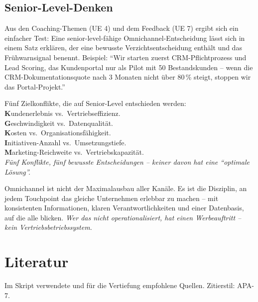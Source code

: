 \documentclass[11pt,a4paper,oneside]{article}
\newcommand{\caveatfontfallback}{\itshape}
\newcommand\caveatfont{\caveatfontfallback}%
\newcommand{\akzent}[1]{{\caveatfont\color{lpAmber}#1}}
\begin{document}
\subsection{Senior-Level-Denken}

Aus den Coaching-Themen (UE 4) und dem Feedback (UE 7) ergibt sich ein einfacher Test: Eine senior-level-fähige Omnichannel-Entscheidung lässt sich in einem Satz erklären, der eine bewusste Verzichts­entscheidung enthält und das Frühwarnsignal benennt. Beispiel: ``Wir starten zuerst CRM-Pflichtprozess und Lead Scoring, das Kundenportal nur als Pilot mit 50 Bestandskunden -- wenn die CRM-Dokumentationsquote nach 3 Monaten nicht über 80\,\% steigt, stoppen wir das Portal-Projekt.''

\begin{eselsbox}[Eselsbrücke: \akzent{K-G-K-I-M}]
Fünf Zielkonflikte, die auf Senior-Level entschieden werden:\\[2pt]
\textbf{K}undenerlebnis vs.\ Vertriebseffizienz.\\
\textbf{G}eschwindigkeit vs.\ Datenqualität.\\
\textbf{K}osten vs.\ Organisationsfähigkeit.\\
\textbf{I}nitiativen-Anzahl vs.\ Umsetzungstiefe.\\
\textbf{M}arketing-Reichweite vs.\ Vertriebskapazität.\\[2pt]
\emph{Fünf Konflikte, fünf bewusste Entscheidungen -- keiner davon hat eine ``optimale Lösung''.}
\end{eselsbox}

\begin{merkbox}
Omnichannel ist nicht der Maximalausbau aller Kanäle. Es ist die Disziplin, an jedem Touchpoint das gleiche Unternehmen erlebbar zu machen -- mit konsistenten Informationen, klaren Verantwortlichkeiten und einer Datenbasis, auf die alle blicken. \emph{Wer das nicht operationalisiert, hat einen Werbeauftritt -- kein Vertriebsbetriebssystem.}
\end{merkbox}

\clearpage
\section{Literatur}

Im Skript verwendete und für die Vertiefung empfohlene Quellen. Zitierstil: APA-7.
\end{document}

